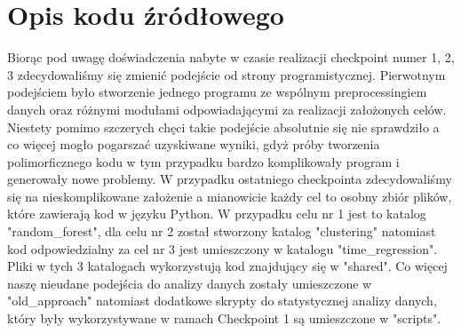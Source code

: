 \documentclass{classrep}
\begin{document}
    \section{Opis kodu źródłowego} {
        Biorąc pod uwagę doświadczenia nabyte w czasie realizacji checkpoint numer 1, 2, 3
        zdecydowaliśmy się zmienić podejście od strony programistycznej. Pierwotnym
        podejściem było stworzenie jednego programu ze wspólnym preprocessingiem danych
        oraz różnymi modułami odpowiadającymi za realizacji założonych celów. Niestety
        pomimo szczerych chęci takie podejście absolutnie się nie sprawdziło a co więcej
        mogło pogarszać uzyskiwane wyniki, gdyż próby tworzenia polimorficznego kodu
        w tym przypadku bardzo komplikowały program i generowały nowe problemy.
        W przypadku ostatniego checkpointa zdecydowaliśmy się na nieskomplikowane
        założenie a mianowicie każdy cel to osobny zbiór plików, które zawierają kod w
        języku Python.
        W przypadku celu nr 1 jest to katalog "random\_forest", dla celu nr 2 został
        stworzony katalog "clustering" natomiast kod odpowiedzialny za cel nr 3 jest
        umieszczony w katalogu "time\_regression". Pliki w tych 3 katalogach
        wykorzystują kod znajdujący się w "shared". Co więcej naszę nieudane podejścia
        do analizy danych zostały umieszczone w "old\_approach" natomiast dodatkowe
        skrypty do statystycznej analizy danych, który były wykorzystywane w ramach
        Checkpoint 1 są umieszczone w "scripts".
    }
    

    \begin{thebibliography}{0}
    \end{thebibliography}
\end{document}
